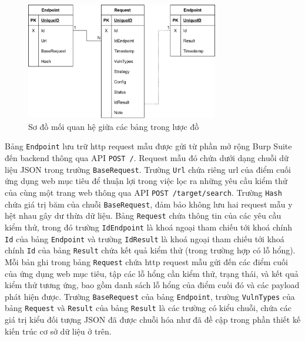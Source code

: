 \begin{figure}[H]
  \centering
    \includegraphics[width=0.75\textwidth,keepaspectratio=true]{images/database-design.png}
  \caption{Sơ đồ mối quan hệ giữa các bảng trong lược đồ}
  \label{fig:db-schema}
\end{figure}
Bảng \texttt{Endpoint} lưu trữ \acrshort{http} request mẫu được gửi từ phần mở rộng Burp Suite đến backend thông qua API \colorbox{gray!30}{\texttt{POST /}}. Request mẫu đó chứa dưới dạng chuỗi dữ liệu JSON trong trường \texttt{BaseRequest}. Trường \texttt{Url} chứa riêng \acrshort{url} của điểm cuối ứng dụng web mục tiêu để thuận lợi trong việc lọc ra những yêu cầu kiểm thử của cùng một trang web thông qua API \colorbox{gray!30}{\texttt{POST /target/search}}. Trường \texttt{Hash} chứa giá trị băm của chuỗi \texttt{BaseRequest}, đảm bảo không lưu hai request mẫu y hệt nhau gây dư thừa dữ liệu. Bảng \texttt{Request} chứa thông tin của các yêu cầu kiểm thử, trong đó trường \texttt{IdEndpoint} là khoá ngoại tham chiếu tới khoá chính \texttt{Id} của bảng \texttt{Endpoint} và trường \texttt{IdResult} là khoá ngoại tham chiếu tới khoá chính \texttt{Id} của bảng \texttt{Result} chứa kết quả kiểm thử (trong trường hợp có lỗ hổng). Mỗi bản ghi trong bảng \texttt{Request} chứa \acrshort{http} request mẫu gửi đến các điểm cuối của ứng dụng web mục tiêu, tập các lỗ hổng cần kiểm thử, trạng thái, và kết quả kiểm thử tương ứng, bao gồm danh sách lỗ hổng của điểm cuối đó và các payload phát hiện được. Trường \texttt{BaseRequest} của bảng \texttt{Endpoint}, trường \texttt{VulnTypes} của bảng \texttt{Request} và \texttt{Result} của bảng \texttt{Result} là các trường có kiểu chuỗi, chứa các giá trị kiểu đối tượng JSON đã được chuỗi hóa như đã đề cập trong phần thiết kế kiến trúc cơ sở dữ liệu ở trên.
